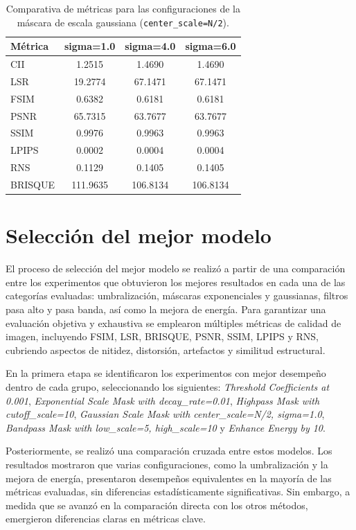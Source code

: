 \begin{table}[H]
    \centering
    \caption{Comparativa de métricas para las configuraciones de la máscara de escala gaussiana (\texttt{center\_scale=N/2}).}
    \begin{tabular}{|l|c|c|c|}
    \hline
    \textbf{Métrica} & \textbf{sigma=1.0} & \textbf{sigma=4.0} & \textbf{sigma=6.0} \\
    \hline
    CII & 1.2515 & 1.4690 & 1.4690 \\
    LSR & 19.2774 & 67.1471 & 67.1471 \\
    FSIM & 0.6382 & 0.6181 & 0.6181 \\
    PSNR & 65.7315 & 63.7677 & 63.7677 \\
    SSIM & 0.9976 & 0.9963 & 0.9963 \\
    LPIPS & 0.0002 & 0.0004 & 0.0004 \\
    RNS & 0.1129 & 0.1405 & 0.1405 \\
    BRISQUE & 111.9635 & 106.8134 & 106.8134 \\
    \hline
    \end{tabular}
    \label{tab:gaussian_comparativa}
\end{table}

\section{Selección del mejor modelo}

El proceso de selección del mejor modelo se realizó a partir de una comparación entre los experimentos que obtuvieron los mejores resultados en cada una de las categorías evaluadas: umbralización, máscaras exponenciales y gaussianas, filtros pasa alto y pasa banda, así como la mejora de energía. Para garantizar una evaluación objetiva y exhaustiva se emplearon múltiples métricas de calidad de imagen, incluyendo FSIM, LSR, BRISQUE, PSNR, SSIM, LPIPS y RNS, cubriendo aspectos de nitidez, distorsión, artefactos y similitud estructural.

En la primera etapa se identificaron los experimentos con mejor desempeño dentro de cada grupo, seleccionando los siguientes: \textit{Threshold Coefficients at 0.001}, \textit{Exponential Scale Mask with decay\_rate=0.01}, \textit{Highpass Mask with cutoff\_scale=10}, \textit{Gaussian Scale Mask with center\_scale=N/2, sigma=1.0}, \textit{Bandpass Mask with low\_scale=5, high\_scale=10} y \textit{Enhance Energy by 10}.

Posteriormente, se realizó una comparación cruzada entre estos modelos. Los resultados mostraron que varias configuraciones, como la umbralización y la mejora de energía, presentaron desempeños equivalentes en la mayoría de las métricas evaluadas, sin diferencias estadísticamente significativas. Sin embargo, a medida que se avanzó en la comparación directa con los otros métodos, emergieron diferencias claras en métricas clave.

